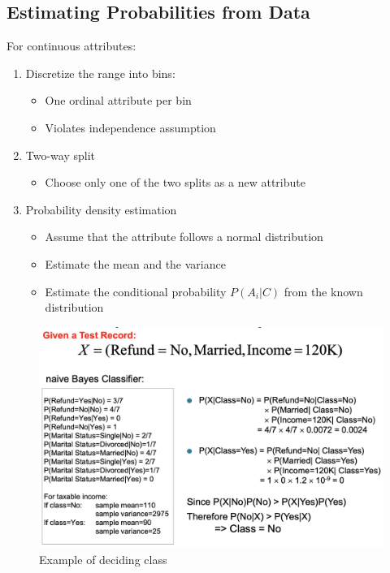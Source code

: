 \subsection{Estimating Probabilities from Data}
For continuous attributes:
\begin{enumerate}
    \item Discretize the range into bins:
    \begin{itemize}
        \item One ordinal attribute per bin
        \item Violates independence assumption
    \end{itemize}
    \item Two-way split
    \begin{itemize}
        \item Choose only one of the two splits as a new attribute
    \end{itemize}
    \item Probability density estimation
    \begin{itemize}
        \item Assume that the attribute follows a normal distribution
        \item Estimate the mean and the variance
        \item Estimate the conditional probability $P(A_i|C)$ from the known distribution
    \end{itemize}
\end{enumerate}

\bigskip
\begin{figure}[H]
\centering
\includegraphics[scale=0.4]{figures/prob_est_data.png}
\caption{Example of deciding class}
\end{figure}

